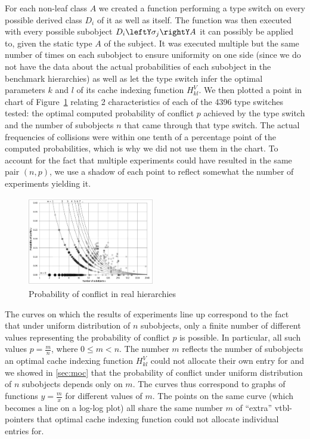 For each non-leaf class $A$ we created a function performing a type switch on 
every possible derived class $D_i$ of it as well as itself. The function was 
then executed with every possible subobject $D_i\leftY\sigma_j\rightY A$ it can  
possibly be applied to, given the static type $A$ of the subject. It was 
executed multiple but the same number of times on each subobject to ensure 
uniformity on one side (since we do not have the data about the actual 
probabilities of each subobject in the benchmark hierarchies) as well as let the 
type switch infer the optimal parameters $k$ and $l$ of its cache indexing 
function $H_{kl}^V$. We then plotted a point in chart of Figure~\ref{fig:prob} 
relating 2 characteristics of each of the 4396 type switches tested: the optimal 
computed probability of conflict $p$ achieved by the type switch and the number 
of subobjects $n$ that came through that type switch. The actual frequencies of 
collisions were within one tenth of a percentage point of the computed 
probabilities, which is why we did not use them in the chart. To account for the 
fact that multiple experiments could have resulted in the same pair $(n,p)$, we 
use a shadow of each point to reflect somewhat the number of experiments 
yielding it.

\begin{figure}[htbp]
  \centering
    \includegraphics[width=0.49\textwidth]{ClassHierarchies.pdf}
  \caption{Probability of conflict in real hierarchies}
  \label{fig:prob}
\end{figure}

The curves on which the results of experiments line up correspond to the fact 
that under uniform distribution of $n$ subobjects, only a finite number of 
different values representing the probability of conflict $p$ is possible. In 
particular, all such values $p=\frac{m}{n}$, where $0 \le m < n$. The number $m$ 
reflects the number of subobjects an optimal cache indexing function $H_{kl}^V$ 
could not allocate their own entry for and we showed in \textsection\ref{sec:moc} 
that the probability of conflict under uniform distribution of $n$ subobjects 
depends only on $m$. The curves thus correspond to graphs of functions 
$y=\frac{m}{x}$ for different values of $m$. The points on the same curve (which 
becomes a line on a log-log plot) all share the same number $m$ of ``extra'' 
vtbl-pointers that optimal cache indexing function could not allocate individual 
entries for.

